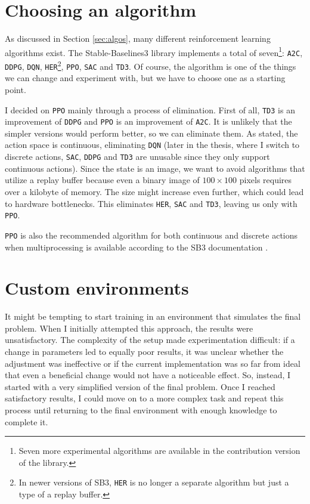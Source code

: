\documentclass[
  digital,     %
  oneside,     %
  nosansbold,  %
  nocolorbold, %
  lof,         %
  lot,         %
]{fithesis4}
\begin{document}
\section{Choosing an algorithm}
As discussed in Section \ref{sec:algos}, many different reinforcement learning algorithms exist. The Stable-Baselines3 library implements a total of seven\footnote{Seven more experimental algorithms are available in the contribution version of the library.}: \texttt{A2C}, \texttt{DDPG}, \texttt{DQN}, \texttt{HER}\footnote{In newer versions of SB3, \texttt{HER} is no longer a separate algorithm but just a type of a replay buffer.}, \texttt{PPO}, \texttt{SAC} and \texttt{TD3}. Of course, the algorithm is one of the things we can change and experiment with, but we have to choose one as a starting point.

I decided on \texttt{PPO} mainly through a process of elimination. First of all, \texttt{TD3} is an improvement of \texttt{DDPG} and \texttt{PPO} is an improvement of \texttt{A2C}. It is unlikely that the simpler versions would perform better, so we can eliminate them. As stated, the action space is continuous, eliminating \texttt{DQN} (later in the thesis, where I switch to discrete actions, \texttt{SAC}, \texttt{DDPG} and \texttt{TD3} are unusable since they only support continuous actions). Since the state is an image, we want to avoid algorithms that utilize a replay buffer because even a binary image of $100\times100$ pixels requires over a kilobyte of memory. The size might increase even further, which could lead to hardware bottlenecks. This eliminates \texttt{HER}, \texttt{SAC} and \texttt{TD3}, leaving us only with \texttt{PPO}.

\texttt{PPO} is also the recommended algorithm for both continuous and discrete actions when multiprocessing is available according to the SB3 documentation \cite{SB3-docs}.

\section{Custom environments}
It might be tempting to start training in an environment that simulates the final problem. When I initially attempted this approach, the results were unsatisfactory. The complexity of the setup made experimentation difficult: if a change in parameters led to equally poor results, it was unclear whether the adjustment was ineffective or if the current implementation was so far from ideal that even a beneficial change would not have a noticeable effect. So, instead, I started with a very simplified version of the final problem. Once I reached satisfactory results, I could move on to a more complex task and repeat this process until returning to the final environment with enough knowledge to complete it.
\end{document}
